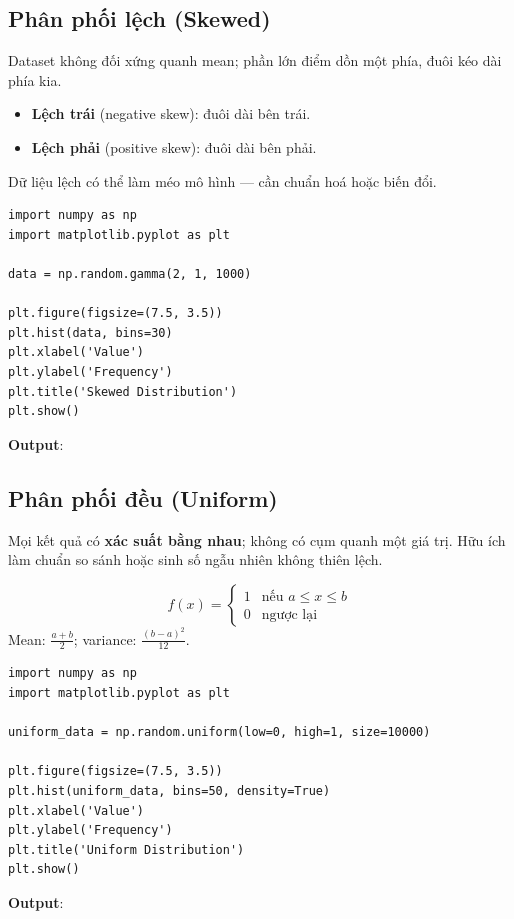 \subsection{Phân phối lệch (Skewed)}

\begin{ynghia}[title={Skewed distribution}]
Dataset không đối xứng quanh mean; phần lớn điểm dồn một phía, đuôi kéo dài phía kia.
\begin{itemize}
  \item \textbf{Lệch trái} (negative skew): đuôi dài bên trái.
  \item \textbf{Lệch phải} (positive skew): đuôi dài bên phải.
\end{itemize}
Dữ liệu lệch có thể làm méo mô hình --- cần chuẩn hoá hoặc biến đổi.
\end{ynghia}

\begin{vidu}[title={Gamma ngẫu nhiên}]
\begin{lstlisting}
import numpy as np
import matplotlib.pyplot as plt

data = np.random.gamma(2, 1, 1000)

plt.figure(figsize=(7.5, 3.5))
plt.hist(data, bins=30)
plt.xlabel('Value')
plt.ylabel('Frequency')
plt.title('Skewed Distribution')
plt.show()
\end{lstlisting}

\textbf{Output}:
\end{vidu}

\subsection{Phân phối đều (Uniform)}

\begin{dinhnghia}[title={Uniform distribution}]
Mọi kết quả có \textbf{xác suất bằng nhau}; không có cụm quanh một giá trị.
Hữu ích làm chuẩn so sánh hoặc sinh số ngẫu nhiên không thiên lệch.
\end{dinhnghia}

\begin{ynghia}[title={PDF liên tục}]
\[
f(x) = \begin{cases}
1 & \text{nếu } a \le x \le b \\
0 & \text{ngược lại}
\end{cases}
\]
Mean: $\frac{a+b}{2}$; variance: $\frac{(b-a)^2}{12}$.
\end{ynghia}

\begin{vidu}[title={Uniform trên $[0,1]$}]
\begin{lstlisting}
import numpy as np
import matplotlib.pyplot as plt

uniform_data = np.random.uniform(low=0, high=1, size=10000)

plt.figure(figsize=(7.5, 3.5))
plt.hist(uniform_data, bins=50, density=True)
plt.xlabel('Value')
plt.ylabel('Frequency')
plt.title('Uniform Distribution')
plt.show()
\end{lstlisting}

\textbf{Output}:
\end{vidu}

